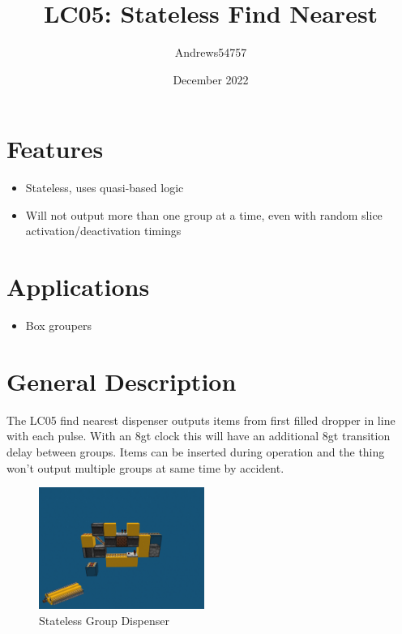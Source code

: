 \documentclass[10pt]{datasheet}
\title{LC05: Stateless Find Nearest}
\author{Andrews54757}
\date{December 2022}
\begin{document}
\maketitle

\section{Features}

\begin{itemize}
\item{Stateless, uses quasi-based logic}
\item{Will not output more than one group at a time, even with random slice activation/deactivation timings}
\end{itemize}

\section{Applications}

\begin{itemize}
\item{Box groupers}
\end{itemize}

\section{General Description}
The LC05 find nearest dispenser outputs items from first filled dropper in line with each pulse. With an 8gt clock this will have an additional 8gt transition delay between groups. Items can be inserted during operation and the thing won't output multiple groups at same time by accident.
\vfill\break

\begin{figure}[h]
    \centering
    \includegraphics[width=0.48\textwidth]{dispense.png}
    \caption{\centering Stateless Group Dispenser}
\end{figure}

\onecolumn
\end{document}
